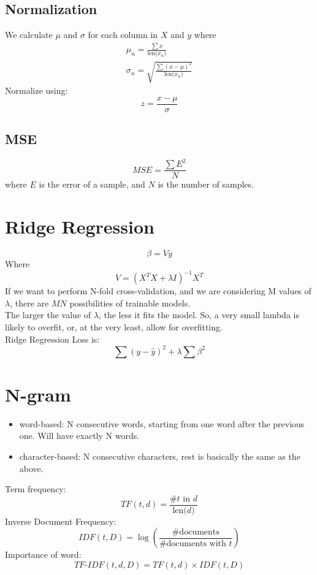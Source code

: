\documentclass{article}
\begin{document}
\subsection{Normalization}
We calculate $\mu$ and $\sigma$ for each column in $X$ and $y$ where 
\begin{eqnarray*}
    \mu_n = \frac{\sum x}{\text{len($x_n$)}}\\
    \sigma_n = \sqrt{\frac{\sum (x-\mu)^2}{\text{len($x_n$)}}}
\end{eqnarray*}
Normalize using:
\begin{equation*}
    z=\frac{x-\mu}{\sigma}
\end{equation*}
\subsection{MSE}
\begin{equation*}
    MSE = \frac{\sum E^2}{N}
\end{equation*}
where $E$ is the error of a sample, and $N$ is the number of samples.
\section{Ridge Regression}
\begin{equation*}
    \beta = Vy
\end{equation*}
Where 
\begin{equation*}
    V = (X^T X+\lambda I)^{-1}X^T
\end{equation*}
If we want to perform N-fold cross-validation, and we are considering M values of $\lambda$, there are $MN$ possibilities of trainable models.\\
The larger the value of $\lambda$, the less it fits the model. So, a very small lambda is likely to overfit, or, at the very least, allow for overfitting.\\
Ridge Regression Loss is:
\begin{equation*}
    \sum(y-\hat{y})^2+\lambda\sum \beta^2
\end{equation*}
\section{N-gram}
\begin{itemize}
    \item word-based: N consecutive words, starting from one word after the previous one. Will have exactly N words.
    \item character-based: N consecutive characters, rest is basically the same as the above.
\end{itemize}
Term frequency:
\begin{equation*}
    TF(t,d) = \frac{\# t \text{ in } d}{\text{len($d$)}}
\end{equation*}
Inverse Document Frequency:
\begin{equation*}
    IDF(t,D) = \log\left(\frac{\#\text{documents}}{\#\text{documents with }t}\right)
\end{equation*}
Importance of word:
\begin{equation*}
    TF\text{-}IDF(t,d,D) = TF(t,d) \times IDF(t,D)
\end{equation*}
\end{document}
